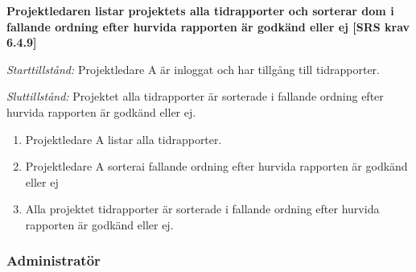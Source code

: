 \documentclass[a4paper]{article}
\begin{document}
\begin{FT}
\item %
\textbf{Projektledaren listar projektets alla tidrapporter och sorterar dom i fallande ordning efter hurvida rapporten är godkänd eller ej [SRS krav 6.4.9]}

\emph{Starttillstånd:} Projektledare A är inloggat och har tillgång till tidrapporter.

\emph{Sluttillstånd:} Projektet alla tidrapporter är sorterade i fallande ordning efter hurvida rapporten är godkänd eller ej.

\begin{enumerate}
\item Projektledare A listar alla tidrapporter.
\item Projektledare A sorterai fallande ordning efter hurvida rapporten är godkänd eller ej
\item Alla projektet tidrapporter är sorterade i fallande ordning efter hurvida rapporten är godkänd eller ej.
\end{enumerate}

\end{FT}

\subsubsection{Administratör}
\end{document}

